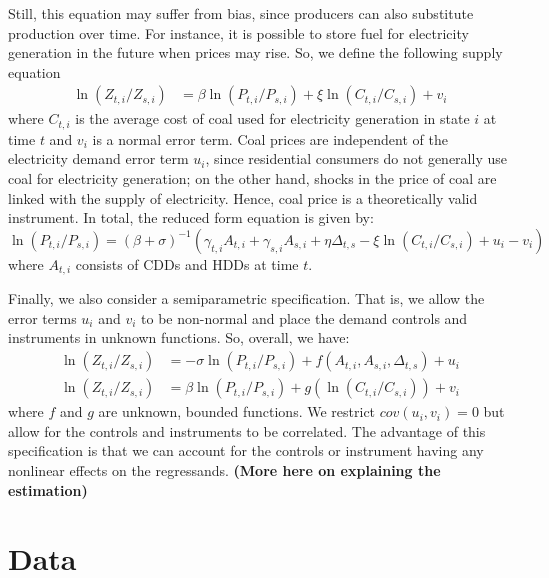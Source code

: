\documentclass[11pt,a4paper]{extarticle}
\begin{document}
Still, this equation may suffer from bias, since producers can also substitute production over time. For instance, it is possible to store fuel for electricity generation in the future when prices may rise. So, we define the following supply equation
\begin{align*}
\ln (Z_{ t, i} / Z_{ s, i}) &= \beta \ln (P_{t,i} / P_{s,i}) + \xi \ln (C_{t,i} / C_{s,i}) + v_{i}
\end{align*}
where $C_{t,i}$ is the average cost of coal used for electricity generation in state $i$ at time $t$ and $v_i$ is a normal error term. Coal prices are independent of the electricity demand error term $u_i$, since residential consumers do not generally use coal for electricity generation; on the other hand, shocks in the price of coal are linked with the supply of electricity. Hence, coal price is a theoretically valid instrument.  In total, the reduced form equation is given by:
$$ \ln (P_{t,i} / P_{s,i}) = \left( \beta + \sigma \right)^{-1} \left( \gamma_{t,i} A_{t,i} + \gamma_{s,i} A_{s,i} + \eta \Delta_{t,s} - \xi \ln (C_{t,i} / C_{s,i}) + u_{i} - v_i \right)  $$
where $A_{t,i}$ consists of CDDs and HDDs at time $t$. 

Finally, we also consider a semiparametric specification. That is, we allow the error terms $u_i$ and $v_i$ to be non-normal and place the demand controls and instruments in unknown functions. So, overall, we have:
\begin{align*}
\ln (Z_{ t, i} / Z_{ s, i}) &= -\sigma \ln (P_{t,i} / P_{s,i}) +  f \left( A_{t,i}, A_{s,i}, \Delta_{t,s} \right) + u_i \\
\ln (Z_{ t, i} / Z_{ s, i}) &= \beta \ln (P_{t,i} / P_{s,i}) + g \left( \ln (C_{t,i} / C_{s,i})  \right) + v_{i}
\end{align*}
where $f$ and $g$ are unknown, bounded functions. We restrict $cov(u_i, v_i) = 0$ but allow for the controls and instruments to be correlated. The advantage of this specification is that we can account for the controls or instrument having any nonlinear effects on the regressands. \textbf{(More here on explaining the estimation)}

\section{Data}
\end{document}
